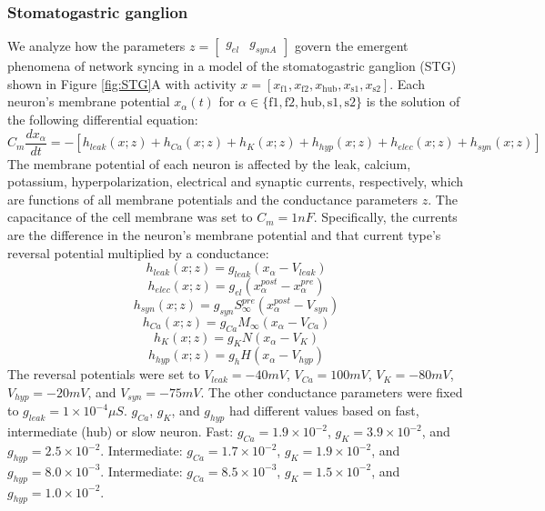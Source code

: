 \documentclass[11pt]{article}
\begin{document}
\subsubsection{Stomatogastric ganglion}\label{methods_STG}
We analyze how the parameters $z = \begin{bmatrix} g_{el} & g_{synA} \end{bmatrix}$ govern the emergent phenomena of network syncing in a model of the stomatogastric ganglion (STG) shown in Figure \ref{fig:STG}A with activity $x = \left[ x_{\text{f1}}, x_{\text{f2}}, x_{\text{hub}}, x_{\text{s1}}, x_{\text{s2}} \right]$.
Each neuron's membrane potential $x_\alpha(t)$ for $\alpha \in \{ \text{f1}, \text{f2}, \text{hub}, \text{s1}, \text{s2} \}$ is the solution of the following differential equation:
\begin{equation} C_m \frac{dx_\alpha}{dt} = - \left[ h_{leak}(x; z) + h_{Ca}(x; z) + h_K(x; z) + h_{hyp}(x; z) + h_{elec}(x; z) + h_{syn}(x; z)\right] 
\end{equation} 
The membrane potential of each neuron is affected by the leak, calcium, potassium, hyperpolarization,
electrical and synaptic currents, respectively, which are functions of  all membrane potentials and the conductance parameters $z$.  
The capacitance of the cell membrane was set to $C_m = 1nF$. Specifically, the currents are the difference in the neuron's membrane potential and that current type's reversal potential multiplied by a conductance:
\begin{equation}  h_{leak}(x; z) = g_{leak} (x_\alpha - V_{leak}) 
\end{equation} 
\begin{equation}  h_{elec}(x; z) = g_{el} (x_\alpha^{post} - x_\alpha^{pre})
\end{equation} 
\begin{equation}  h_{syn}(x; z) = g_{syn} S_\infty^{pre} (x_\alpha^{post} - V_{syn}) \end{equation} 
\begin{equation}  h_{Ca}(x; z) = g_{Ca} M_\infty (x_\alpha - V_{Ca}) 
\end{equation} 
\begin{equation}  h_K(x; z) = g_K N (x_\alpha - V_K) 
\end{equation} 
\begin{equation}  h_{hyp}(x; z) = g_h H(x_\alpha - V_{hyp})
\end{equation} 
The reversal potentials were set to $V_{leak} = -40mV$, $V_{Ca} = 100mV$, $V_K = -80mV$, $V_{hyp} = -20mV$, and $V_{syn} = -75mV$.  The other conductance parameters were fixed to $g_{leak} = 1 \times 10^{-4} \mu S$. $g_{Ca}$, $g_{K}$, and $g_{hyp}$ had different values based on fast, intermediate (hub) or slow neuron.  Fast: $g_{Ca} = 1.9 \times 10^{-2}$, $ g_K = 3.9 \times 10^{-2} $, and $ g_{hyp} = 2.5 \times 10^{-2} $.  Intermediate: $g_{Ca} = 1.7 \times 10^{-2}$, $ g_K = 1.9 \times 10^{-2} $, and $ g_{hyp} = 8.0 \times 10^{-3} $.  Intermediate: $g_{Ca} = 8.5 \times 10^{-3}$, $ g_K = 1.5 \times 10^{-2} $, and $ g_{hyp} = 1.0 \times 10^{-2} $.
\end{document}
